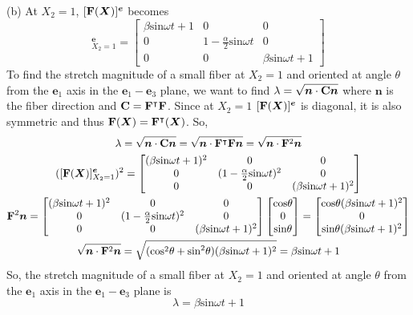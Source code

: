 \medskip
(b) At $X_2=1$, $[\mathbf{F}(\bm{X})]^{\bm{e}}$ becomes
\begin{equation*}
    [\bn{F}(\bm{X})]^{\bm{e}}_{X_2=1}=\begin{bmatrix}
        \beta\text{sin}\omega t+1& 0& 0\\ 0& 1-\frac{\alpha}{2}\text{sin}\omega t&0 \\0 & 0&\beta\text{sin}\omega t+1 \end{bmatrix}
\end{equation*}
To find the stretch magnitude of a small fiber at $X_2=1$ and oriented at angle $\theta$ from the $\bm{e}_1$ axis in the $\bm{e}_1-\bm{e}_3$ plane, we want to find $\lambda=\sqrt{\bm{n}\cdot\mathbf{C}\bm{n}}$ where $\bm{n}$ is the fiber direction and $\mathbf{C}=\mathbf{F}^\intercal\mathbf{F}$. Since at $X_2=1$ $[\mathbf{F}(\bm{X})]^{\bm{e}}$ is diagonal, it is also symmetric and thus $\mathbf{F}(\bm{X})=\mathbf{F}^{\intercal}(\bm{X})$. So,
\begin{gather*}
    \lambda=\sqrt{\bm{n}\cdot\mathbf{C}\bm{n}}=\sqrt{\bm{n}\cdot\mathbf{F}^{\intercal}\mathbf{F}\bm{n}}=\sqrt{\bm{n}\cdot\mathbf{F}^2\bm{n}}\\
    ([\mathbf{F}(\bm{X})]^{\bm{e}}_{X_2=1})^2=\begin{bmatrix}
        (\beta\text{sin}\omega t+1)^2& 0& 0\\ 0& (1-\frac{\alpha}{2}\text{sin}\omega t)^2&0 \\0 & 0&(\beta\text{sin}\omega t+1)^2 \end{bmatrix}\\
        \mathbf{F}^2\bm{n}=\begin{bmatrix}
        (\beta\text{sin}\omega t+1)^2& 0& 0\\ 0& (1-\frac{\alpha}{2}\text{sin}\omega t)^2&0 \\0 & 0&(\beta\text{sin}\omega t+1)^2 \end{bmatrix}\begin{bmatrix}
            \text{cos}\theta\\0\\\text{sin}\theta
        \end{bmatrix}=\begin{bmatrix}
            \text{cos}\theta(\beta\text{sin}\omega t+1)^2\\0\\\text{sin}\theta(\beta\text{sin}\omega t+1)^2
        \end{bmatrix}\\
        \sqrt{\bm{n}\cdot\mathbf{F}^2\bm{n}}=\sqrt{(\text{cos}^2\theta+\text{sin}^2\theta)(\beta\text{sin}\omega t +1)^2}=\beta\text{sin}\omega t +1
\end{gather*}
So, the stretch magnitude of a small fiber at $X_2=1$ and oriented at angle $\theta$ from the $\bm{e}_1$ axis in the $\bm{e}_1-\bm{e}_3$ plane is 
\begin{equation*}
    \lambda=\beta\text{sin}\omega t +1
\end{equation*}

